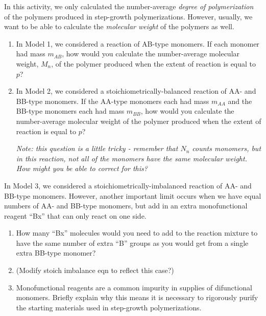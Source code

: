 \begin{activity}
\begin{exercises}
	
		\exercise In this activity, we only calculated the number-average \emph{degree of polymerization} of the polymers produced in step-growth polymerizations. However, usually, we want to be able to calculate the \emph{molecular weight} of the polymers as well.
		
			\begin{enumerate}
				\item In Model 1, we considered a reaction of AB-type monomers.  If each monomer had mass $m_{AB}$, how would you calculate the number-average molecular weight, $M_n$, of the polymer produced when the extent of reaction is equal to $p$?
				
				\item In Model 2, we considered a stoichiometrically-balanced reaction of AA- and BB-type monomers. If the AA-type monomers each had mass $m_{AA}$ and the BB-type monomers each had mass $m_{BB}$, how would you calculate the number-average molecular weight of the polymer produced when the extent of reaction is equal to $p$?
				
					\emph{Note: this question is a little tricky - remember that $N_n$ counts \emph{monomers}, but in this reaction, not all of the monomers have the same molecular weight.  How might you be able to correct for this?}
				
			\end{enumerate}
		
		\exercise In Model 3, we considered a stoichiometrically-imbalanced reaction of AA- and BB-type monomers.  However, another important limit occurs when we have equal numbers of AA- and BB-type monomers, but add in an extra monofunctional reagent ``Bx'' that can only react on one side.
		
			\begin{enumerate}
				\item How many ``Bx'' molecules would you need to add to the reaction mixture to have the same number of extra ``B'' groups as you would get from a single extra BB-type monomer?
				
				\item (Modify stoich imbalance eqn to reflect this case?)
				
				\item Monofunctional reagents are a common impurity in supplies of difunctional monomers. Briefly explain why this means it is necessary to rigorously purify the starting materials used in step-growth polymerizations.
			\end{enumerate}
\end{exercises}
	
\end{activity}